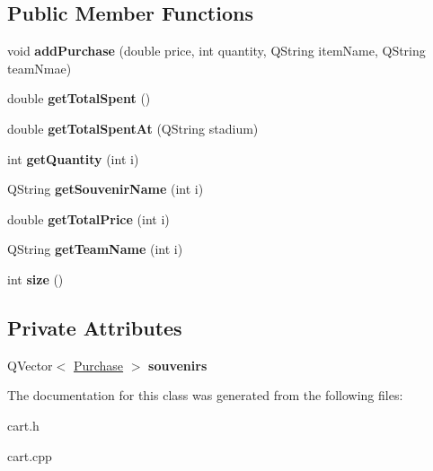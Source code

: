 \subsection*{Public Member Functions}
\begin{DoxyCompactItemize}
\item 
\mbox{\label{class_cart_a2260991ab57f2d95e17e977e4c183fdd}} 
void {\bfseries add\+Purchase} (double price, int quantity, Q\+String item\+Name, Q\+String team\+Nmae)
\item 
\mbox{\label{class_cart_a2299824d255f3110ad5eda5bfbd1b3ac}} 
double {\bfseries get\+Total\+Spent} ()
\item 
\mbox{\label{class_cart_a45873b2f5d9913f9de39599d8ab25a12}} 
double {\bfseries get\+Total\+Spent\+At} (Q\+String stadium)
\item 
\mbox{\label{class_cart_abced3b2b64a6800abb3e37b62496d2e5}} 
int {\bfseries get\+Quantity} (int i)
\item 
\mbox{\label{class_cart_ad4906647eb9e958121d301f4aa9eb215}} 
Q\+String {\bfseries get\+Souvenir\+Name} (int i)
\item 
\mbox{\label{class_cart_a2d0efd1dac0bcbe20c739dfdc2db8d05}} 
double {\bfseries get\+Total\+Price} (int i)
\item 
\mbox{\label{class_cart_ae084fb0f5de20ded9e938dc28676daea}} 
Q\+String {\bfseries get\+Team\+Name} (int i)
\item 
\mbox{\label{class_cart_ac89333c3766ab987cad13fc430407b78}} 
int {\bfseries size} ()
\end{DoxyCompactItemize}
\subsection*{Private Attributes}
\begin{DoxyCompactItemize}
\item 
\mbox{\label{class_cart_a546a0df14f71469925c0cf008667983c}} 
Q\+Vector$<$ \hyperlink{class_purchase}{Purchase} $>$ {\bfseries souvenirs}
\end{DoxyCompactItemize}


The documentation for this class was generated from the following files\+:\begin{DoxyCompactItemize}
\item 
cart.\+h\item 
cart.\+cpp\end{DoxyCompactItemize}
